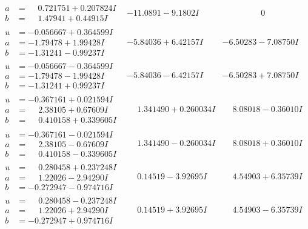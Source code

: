 \documentclass[1p]{elsarticle_modified}
\theoremstyle{definition}
\begin{document}
$$\begin{array}{c|c|c}
\begin{aligned}
a &= \phantom{-}0.721751 + 0.207824 I \\
b &= \phantom{-}1.47941 + 0.44915 I\end{aligned}
 & -11.0891 - 9.1802 I & \phantom{-0.000000 } 0 \\ \hline\begin{aligned}
u &= -0.056667 + 0.364599 I \\
a &= -1.79478 + 1.99428 I \\
b &= -1.31241 - 0.99237 I\end{aligned}
 & -5.84036 + 6.42157 I & -6.50283 - 7.08750 I \\ \hline\begin{aligned}
u &= -0.056667 - 0.364599 I \\
a &= -1.79478 - 1.99428 I \\
b &= -1.31241 + 0.99237 I\end{aligned}
 & -5.84036 - 6.42157 I & -6.50283 + 7.08750 I \\ \hline\begin{aligned}
u &= -0.367161 + 0.021594 I \\
a &= \phantom{-}2.38105 + 0.67609 I \\
b &= \phantom{-}0.410158 + 0.339605 I\end{aligned}
 & \phantom{-}1.341490 + 0.260034 I & \phantom{-}8.08018 - 0.36010 I \\ \hline\begin{aligned}
u &= -0.367161 - 0.021594 I \\
a &= \phantom{-}2.38105 - 0.67609 I \\
b &= \phantom{-}0.410158 - 0.339605 I\end{aligned}
 & \phantom{-}1.341490 - 0.260034 I & \phantom{-}8.08018 + 0.36010 I \\ \hline\begin{aligned}
u &= \phantom{-}0.280458 + 0.237248 I \\
a &= \phantom{-}1.22026 - 2.94290 I \\
b &= -0.272947 - 0.974716 I\end{aligned}
 & \phantom{-}0.14519 - 3.92695 I & \phantom{-}4.54903 + 6.35739 I \\ \hline\begin{aligned}
u &= \phantom{-}0.280458 - 0.237248 I \\
a &= \phantom{-}1.22026 + 2.94290 I \\
b &= -0.272947 + 0.974716 I\end{aligned}
 & \phantom{-}0.14519 + 3.92695 I & \phantom{-}4.54903 - 6.35739 I \\ \hline\begin{aligned}

\end{aligned}
\end{array}$$
\end{document}
